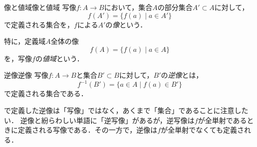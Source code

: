 \begin{definition}{像と値域}{像と値域}
  写像$f \colon A \to B$において，集合$A$の部分集合$A' \subset A$に対して，
  \[
    f(A') = \{ f(a) \mid a \in A' \}
  \]
  で定義される集合を，$f$による$A'$の\emph{像}という．

  特に，定義域$A$全体の像
  \[
    f(A) = \{ f(a) \mid a \in A \}
  \]
  を，写像$f$の\emph{値域}という．

   
\end{definition}


\begin{definition}{逆像}{逆像}
  写像$f \colon A \to B$と集合$B' \subset B$に対して，$B'$の\emph{逆像}とは，
  \[
    f^{-1}(B') = \{ a \in A \mid f(a) \in B' \}
  \]
  で定義される集合である．

\end{definition}

\begin{mycolumn}
  で定義した逆像は「写像」ではなく，あくまで「集合」であることに注意したい．
  逆像と紛らわしい単語に「逆写像」があるが，逆写像は$f$が全単射であるときに定義される写像である．その一方で，逆像は$f$が全単射でなくても定義される．
\end{mycolumn}


